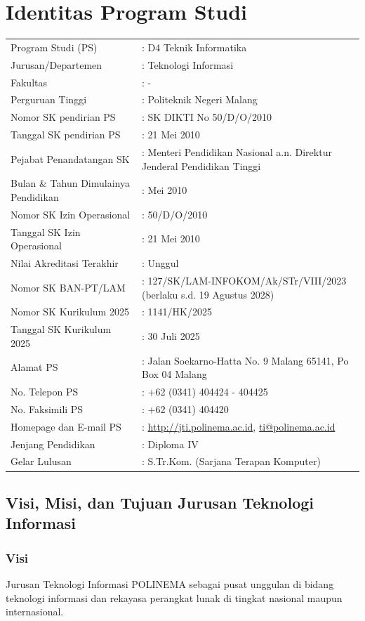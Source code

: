 \chapter{Identitas Program Studi}

\begin{tabular}{L{5cm}L{9cm}}
Program Studi (PS) & : D4 Teknik Informatika \\
Jurusan/Departemen & : Teknologi Informasi \\
Fakultas & : - \\
Perguruan Tinggi & : Politeknik Negeri Malang \\
Nomor SK pendirian PS & : SK DIKTI No 50/D/O/2010 \\
Tanggal SK pendirian PS & : 21 Mei 2010 \\
Pejabat Penandatangan SK & : Menteri Pendidikan Nasional a.n. Direktur Jenderal Pendidikan Tinggi \\
Bulan \& Tahun Dimulainya Pendidikan & : Mei 2010 \\
Nomor SK Izin Operasional & : 50/D/O/2010 \\
Tanggal SK Izin Operasional & : 21 Mei 2010 \\
Nilai Akreditasi Terakhir & : Unggul \\
Nomor SK BAN-PT/LAM & : 127/SK/LAM-INFOKOM/Ak/STr/VIII/2023 (berlaku s.d. 19 Agustus 2028) \\
Nomor SK Kurikulum 2025 & : 1141/HK/2025 \\
Tanggal SK Kurikulum 2025 & : 30 Juli 2025 \\
Alamat PS & : Jalan Soekarno-Hatta No. 9 Malang 65141, Po Box 04 Malang \\
No. Telepon PS & : +62 (0341) 404424 - 404425 \\
No. Faksimili PS & : +62 (0341) 404420 \\
Homepage dan E-mail PS & : \url{http://jti.polinema.ac.id}, \url{ti@polinema.ac.id} \\
Jenjang Pendidikan & : Diploma IV \\
Gelar Lulusan & : S.Tr.Kom. (Sarjana Terapan Komputer) \\
\end{tabular}

\clearpage

\section{Visi, Misi, dan Tujuan Jurusan Teknologi Informasi}

\subsection{Visi}
Jurusan Teknologi Informasi POLINEMA sebagai pusat unggulan di bidang teknologi informasi dan rekayasa perangkat lunak di tingkat nasional maupun internasional.


